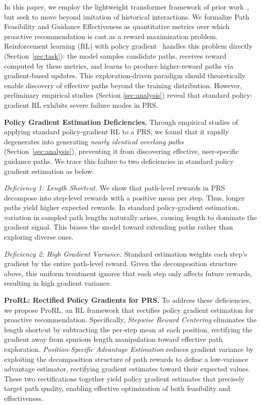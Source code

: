 \documentclass{llmxive}
\begin{document}
In this paper, we employ the lightweight transformer framework of prior work~\cite{zhu2023influential}, but seek to move beyond imitation of historical interactions. We formalize Path Feasibility and Guidance Effectiveness as quantitative metrics over which proactive recommendation is cast as a reward maximization problem. Reinforcement learning (RL) with policy gradient~\cite{sutton1999policy,mei2026good} handles this problem directly (Section~\ref{sec:task}): the model samples candidate paths, receives reward computed by these metrics, and learns to produce higher-reward paths via gradient-based updates. This exploration-driven paradigm should theoretically enable discovery of effective paths beyond the training distribution. However, preliminary empirical studies (Section \ref{sec:analysis}) reveal that standard policy-gradient RL exhibits severe failure modes in PRS.

\textbf{Policy Gradient Estimation Deficiencies.} Through empirical studies of applying standard policy-gradient RL to a PRS, we found that it rapidly degenerates into generating \emph{nearly identical overlong paths} (Section~\ref{sec:analysis}), preventing it from discovering effective, user-specific guidance paths. 
We trace this failure to two deficiencies in standard policy gradient estimation as below.

\emph{Deficiency 1: Length Shortcut.} We show that path-level rewards in PRS decompose into step-level rewards with a positive mean per step. Thus, longer paths yield higher expected rewards. In standard policy-gradient estimation, variation in sampled path lengths naturally arises, causing length to dominate the gradient signal. This biases the model toward extending paths rather than exploring diverse ones.

\emph{Deficiency 2: High Gradient Variance.} Standard estimation weights each step's gradient by the entire path-level reward. Given the decomposition structure above, this uniform treatment ignores that each step only affects future rewards, resulting in high gradient variance.

\textbf{ProRL: Rectified Policy Gradients for PRS.} 
To address these deficiencies, we propose ProRL, an RL framework that rectifies policy gradient estimation for proactive recommendation. 
Specifically, 
\emph{Stepwise Reward Centering} eliminates the length shortcut by subtracting the per-step mean at each position, rectifying the gradient away from spurious length manipulation toward effective path exploration. \emph{Position-Specific Advantage Estimation} reduces gradient variance by exploiting the decomposition structure of path rewards to define a low-variance advantage estimator, rectifying gradient estimates toward their expected values. These two rectifications together yield policy gradient estimates that precisely target path quality, enabling effective optimization of both feasibility and effectiveness.
\end{document}
